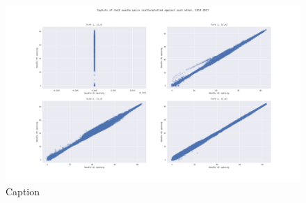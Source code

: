     
    \begin{figure}
        \centering
        \includegraphics[width=\textwidth]{report/figures/analysis/uvdal1/uvd1_scatterplot_all_needels.png}
        \caption{Caption}
        \label{fig:my_label}
    \end{figure}
    
